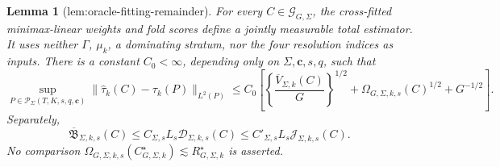 \documentclass{article}
\newtheorem{lemma}{Lemma}
\begin{document}
\begin{lemma}[lem:oracle-fitting-remainder]\label{lem:oracle-fitting-remainder}
For every \(C\in\mathcal G_{G,\Sigma}\), the cross-fitted minimax-linear weights and fold scores define a jointly measurable total estimator. It uses neither \(\Gamma\), \(\mu_k\), a dominating stratum, nor the four resolution indices as inputs. There is a constant \(C_0<\infty\), depending only on \(\Sigma,\mathbf c,s,q\), such that \[\sup_{P\in\mathcal P_\Sigma(T,K,s,q,\mathbf c)}\|\widehat\tau_k(C)-\tau_k(P)\|_{L^2(P)}\le C_0\left[\left\{\frac{\overline V_{\Sigma,k}(C)}G\right\}^{1/2}+\Omega_{G,\Sigma,k,s}(C)^{1/2}+G^{-1/2}\right].\] Separately, \[\overline{\mathfrak B}_{\Sigma,k,s}(C)\le C_{\Sigma,s}L_s\mathcal D_{\Sigma,k,s}(C)\le C'_{\Sigma,s}L_s\mathcal J_{\Sigma,k,s}(C).\] No comparison \(\Omega_{G,\Sigma,k,s}(C_{G,\Sigma,k}^{\star})\lesssim R_{G,\Sigma,k}^{\star}\) is asserted.
\end{lemma}
\end{document}
